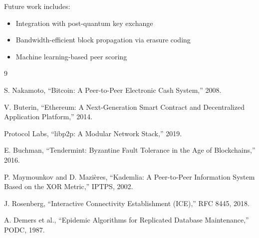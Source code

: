 \documentclass[11pt,a4paper]{article}
\begin{document}
Future work includes:
\begin{itemize}
    \item Integration with post-quantum key exchange
    \item Bandwidth-efficient block propagation via erasure coding
    \item Machine learning-based peer scoring
\end{itemize}

\begin{thebibliography}{9}

S. Nakamoto, ``Bitcoin: A Peer-to-Peer Electronic Cash System,'' 2008.

V. Buterin, ``Ethereum: A Next-Generation Smart Contract and Decentralized Application Platform,'' 2014.

Protocol Labs, ``libp2p: A Modular Network Stack,'' 2019.

E. Buchman, ``Tendermint: Byzantine Fault Tolerance in the Age of Blockchains,'' 2016.

P. Maymounkov and D. Mazi\`{e}res, ``Kademlia: A Peer-to-Peer Information System Based on the XOR Metric,'' IPTPS, 2002.

J. Rosenberg, ``Interactive Connectivity Establishment (ICE),'' RFC 8445, 2018.

A. Demers et al., ``Epidemic Algorithms for Replicated Database Maintenance,'' PODC, 1987.

\end{thebibliography}
\end{document}
